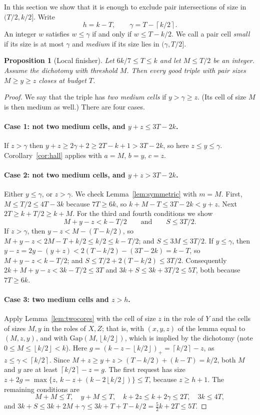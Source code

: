 \documentclass[11pt]{article}
\numberwithin{equation}{section}
\newtheorem{proposition}[theorem]{Proposition}
\theoremstyle{definition}
\theoremstyle{remark}
\newcommand{\ceil}[1]{\left\lceil #1\right\rceil}
\newcommand{\floor}[1]{\left\lfloor #1\right\rfloor}
\newcommand{\Gap}{\mathrm{Gap}}
\begin{document}
In this section we show that it is enough to exclude pair intersections
of size in $(T/2,k/2]$. Write
\[
 h=k-T,\qquad \gamma=T-\ceil{k/2}.
\]
An integer $w$ satisfies $w\le\gamma$ if and only if $w\le T-k/2$. We
call a pair cell \emph{small} if its size is at most $\gamma$ and
\emph{medium} if its size lies in $(\gamma,T/2]$.

\begin{proposition}[Local finisher]\label{prop:localfinish}
Let $6k/7\le T\le k$ and let $M\le T/2$ be an integer. Assume the
dichotomy with threshold $M$. Then every good triple with pair sizes
$M\ge y\ge z$ closes at budget $T$.
\end{proposition}

\begin{proof}
We say that the triple has \emph{two medium cells} if $y>\gamma\ge z$.
(Its cell of size $M$ is then medium as well.) There are four cases.

\paragraph{Case 1: not two medium cells, and $y+z\le3T-2k$.}
If $z>\gamma$ then $y+z\ge2\gamma+2\ge2T-k+1>3T-2k$, so here $z\le y\le\gamma$.
Corollary~\ref{cor:hall} applies with $a=M$, $b=y$, $c=z$.

\paragraph{Case 2: not two medium cells, and $y+z>3T-2k$.}
Either $y\le\gamma$, or $z>\gamma$. We check
Lemma~\ref{lem:symmetric} with $m=M$. First, $M\le T/2\le4T-3k$ because
$7T\ge6k$, so $k+M-T\le3T-2k<y+z$. Next $2T\ge k+T/2\ge k+M$. For the
third and fourth conditions we show
\[
 M+y-z<k-T/2\qquad\text{and}\qquad S\le3T/2 .
\]
If $z>\gamma$, then $y-z<M-(T-k/2)$, so $M+y-z<2M-T+k/2\le k/2\le k-T/2$;
and $S\le3M\le3T/2$. If $y\le\gamma$, then $y-z=2y-(y+z)<2(T-k/2)-(3T-2k)=k-T$,
so $M+y-z<k-T/2$; and $S\le T/2+2(T-k/2)\le3T/2$. Consequently
$2k+M+y-z<3k-T/2\le3T$ and $3k+S\le3k+3T/2\le5T$, both because $7T\ge6k$.

\paragraph{Case 3: two medium cells and $z>h$.}
Apply Lemma~\ref{lem:twocores} with the cell of size $z$ in the role of
$Y$ and the cells of sizes $M,y$ in the roles of $X,Z$; that is, with
$(x,y,z)$ of the lemma equal to $(M,z,y)$, and with $\Gap(M,\floor{k/2})$,
which is implied by the dichotomy (note $0\le M\le\floor{k/2}<k$). Here
$g=(k-z-\floor{k/2})_+=\ceil{k/2}-z$, as $z\le\gamma<\ceil{k/2}$. Since
$M+z\ge y+z>(T-k/2)+(k-T)=k/2$, both $M$ and $y$ are at least
$\ceil{k/2}-z=g$. The first request has size
$z+2g=\max\{z,\,k-z+(k-2\floor{k/2})\}\le T$, because $z\ge h+1$. The
remaining conditions are
\[
 M+M\le T,\quad y+M\le T,\quad k+2z\le k+2\gamma\le2T,\quad 3k\le4T,
\]
and $3k+S\le3k+2M+\gamma\le3k+T+T-k/2=\tfrac52k+2T\le5T$.


\end{proof}
\end{document}
